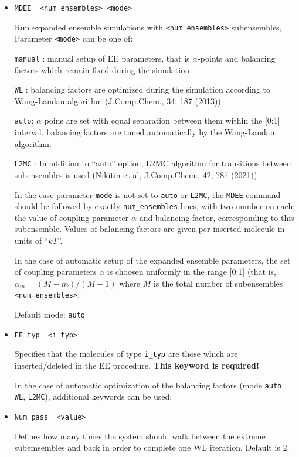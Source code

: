 \documentclass{article}
\begin{document}
\begin{itemize}

\item
\verb|MDEE  <num_ensembles> <mode>|

Run expanded ensemble simulations with \verb|<num_ensembles>| subensembles,
Parameter \verb|<mode>| can be one of:

\verb|manual| : manual setup of EE  parameters, that is  $\alpha$-points
and balancing factors which remain fixed during the simulation

\verb|WL| : balancing factors are optimized during the simulation according to
Wang-Landau algorithm (J.Comp.Chem., 34, 187 (2013))

\verb|auto|: $\alpha$ poins are set with equal separation between them
within the [0:1] interval, balancing factors are tuned automatically by
the Wang-Landau algorithm.

\verb|L2MC| : In addition to ``auto'' option, L2MC algorithm for transitions between
subensembles is used (Nikitin et al, J.Comp.Chem., 42, 787 (2021))

In the case parameter \verb|mode| is not set to \verb|auto| or \verb|L2MC|, the \verb|MDEE|
command should be followed by exactly \verb|num_ensembles| lines,
with two number on each: the value of coupling parameter $\alpha$ and
balancing factor, corresponding to this subensemble. Values of balancing 
factors are given per inserted molecule in units of ``$kT$''.

In the case of automatic setup of the expanded ensemble parameters,
the set of coupling parameters $\alpha$ is choosen uniformly in the range [0:1]
(that is, $\alpha_m = (M-m)/(M-1)$ where $M$ is the total number of
subensembles \verb|<num_ensembles>|. 

Default mode:  \verb|auto|

\item
\verb|EE_typ  <i_typ>|

Specifies that the molecules of type \verb|i_typ| are those which are
inserted/deleted in the EE procedure.
{\bf This keyword is required!}


In the case of automatic optimization of the balancing factors (mode 
\verb|auto|, \verb|WL|, \verb|L2MC|), additional keywords can be used:


\item
\verb|Num_pass  <value>|

Defines how many times the system should walk between the extreme 
subemsembles and back in order to complete one WL iteration.
Default is 2.


\end{itemize}
\end{document}

